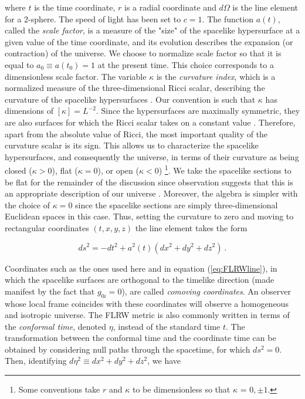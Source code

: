 \documentclass[10pt,letterpaper,final]{iopart}
\numberwithin{equation}{subsection}
\def\ni{\noindent}
\begin{document}
\ni where $t$ is the time coordinate, $r$ is a radial coordinate and $d\Omega$ is the line element for a 2-sphere. The speed of light has been set to $c = 1$.  The function $a(t)$, called the \emph{scale factor}, is a measure of the "size" of the spacelike hypersurface at a given value of the time coordinate, and its evolution describes the expansion (or contraction) of the universe. We choose to normalize scale factor so that it is equal to $a_0 \equiv a(t_0) =1$ at the present time. This choice corresponds to a dimensionless scale factor. The variable $\kappa$ is the \emph{curvature index}, which is a normalized measure of the three-dimensional Ricci scalar, describing the curvature of the spacelike hypersurfaces \cite{Carroll}. Our convention is such that $\kappa$ has dimensions of $[\kappa] = L^{-2}$. Since the hypersurfaces are maximally symmetric, they are also surfaces for which the Ricci scalar takes on a constant value \cite{Carroll}. Therefore, apart from the absolute value of Ricci, the most important quality of the curvature scalar is its sign. This allows us to characterize the spacelike hypersurfaces, and consequently the universe, in terms of their curvature as being closed ($\kappa>0$), flat ($\kappa=0$), or open ($\kappa<0$) \footnote{Some conventions take $r$ and $\kappa$ to be dimensionless so that $\kappa$ = $0, \pm 1$.}. We take the spacelike sections to be flat for the remainder of the discussion since observation suggests that this is an appropriate description of our universe \cite{Dodelson}\cite{Planck1}. Moreover, the algebra is simpler with the choice of $\kappa = 0$ since the spacelike sections are simply three-dimensional Euclidean spaces in this case. Thus, setting the curvature to zero and moving to rectangular coordinates $(t,x,y,z)$ the line element takes the form

\begin{equation}\label{eq:flatFLRW}
ds^2 = -dt^2 + a^2(t)(dx^2 + dy^2 + dz^2) \ .
\end{equation}

\ni Coordinates such as the ones used here and in equation (\ref{eq:FLRWline}), in which the spacelike surfaces are orthogonal to the timelike direction (made manifest by the fact that $g_{0i} = 0$), are called \emph{comoving coordinates}. An observer whose local frame coincides with these coordinates will observe a homogeneous and isotropic universe. The FLRW metric is also commonly written in terms of the \emph{conformal time}, denoted $\eta$, instead of the standard time $t$. The transformation between the conformal time and the coordinate time can be obtained by considering null paths through the spacetime, for which $ds^2 = 0$. Then, identifying $d\eta^2 \equiv dx^2 + dy^2 + dz^2$, we have
\end{document}
